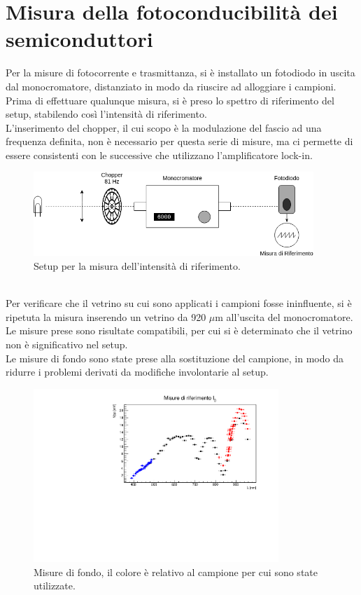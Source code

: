 \documentclass[11pt]{article} %
\begin{document}
\section{Misura della fotoconducibilità dei semiconduttori}
Per la misure di fotocorrente e trasmittanza, si è installato un fotodiodo in uscita dal monocromatore,  distanziato in modo da riuscire ad alloggiare i campioni. Prima di effettuare qualunque misura, si è preso lo spettro di riferimento del setup, stabilendo così l'intensità di riferimento.\\
L'inserimento del chopper, il cui scopo è la modulazione del fascio ad una frequenza definita, non è necessario per questa serie di misure, ma ci permette di essere consistenti con le successive che utilizzano l'amplificatore lock-in.
\begin{figure}[h!]
\begin{center}
\includegraphics[width=400px]{img/foto_rif.png}
\caption{Setup per la misura dell'intensità di riferimento.}
\end{center}
\end{figure}
\\Per verificare che il vetrino su cui sono applicati i campioni fosse ininfluente, si è ripetuta la misura inserendo un vetrino da 920 $\mu$m all'uscita del monocromatore. Le misure prese sono risultate compatibili, per cui si è determinato che il vetrino non è significativo nel setup.\\
Le misure di fondo sono state prese alla sostituzione del campione, in modo da ridurre i problemi derivati da modifiche involontarie al setup.
\begin{figure}[h!]
\begin{center}
\includegraphics[width=350px]{img/fondo.pdf}
\caption{Misure di fondo, il colore è relativo al campione per cui sono state utilizzate.}
\end{center}
\end{figure}
\end{document}
